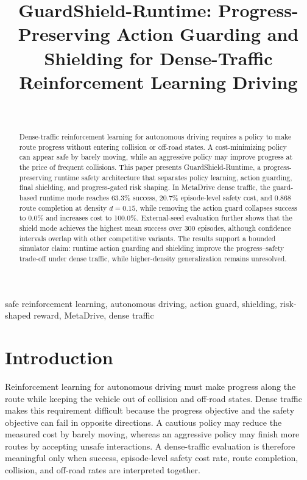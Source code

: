 \documentclass[conference,a4paper]{IEEEtran}
\newcommand{\method}{GuardShield-Runtime}
\begin{document}
\title{GuardShield-Runtime: Progress-Preserving Action Guarding and Shielding for Dense-Traffic Reinforcement Learning Driving}
\author{\\
}
\maketitle
\begin{abstract}
Dense-traffic reinforcement learning for autonomous driving requires a policy to make route progress without entering collision or off-road states. A cost-minimizing policy can appear safe by barely moving, while an aggressive policy may improve progress at the price of frequent collisions. This paper presents \method{}, a progress-preserving runtime safety architecture that separates policy learning, action guarding, final shielding, and progress-gated risk shaping. In MetaDrive dense traffic, the guard-based runtime mode reaches 63.3\% success, 20.7\% episode-level safety cost, and 0.868 route completion at density $d=0.15$, while removing the action guard collapses success to 0.0\% and increases cost to 100.0\%. External-seed evaluation further shows that the shield mode achieves the highest mean success over 300 episodes, although confidence intervals overlap with other competitive variants. The results support a bounded simulator claim: runtime action guarding and shielding improve the progress--safety trade-off under dense traffic, while higher-density generalization remains unresolved.
\end{abstract}
\begin{IEEEkeywords}
safe reinforcement learning, autonomous driving, action guard, shielding, risk-shaped reward, MetaDrive, dense traffic
\end{IEEEkeywords}
\section{Introduction}
Reinforcement learning for autonomous driving must make progress along the route while keeping the vehicle out of collision and off-road states. Dense traffic makes this requirement difficult because the progress objective and the safety objective can fail in opposite directions. A cautious policy may reduce the measured cost by barely moving, whereas an aggressive policy may finish more routes by accepting unsafe interactions. A dense-traffic evaluation is therefore meaningful only when success, episode-level safety cost rate, route completion, collision, and off-road rates are interpreted together.
\end{document}
